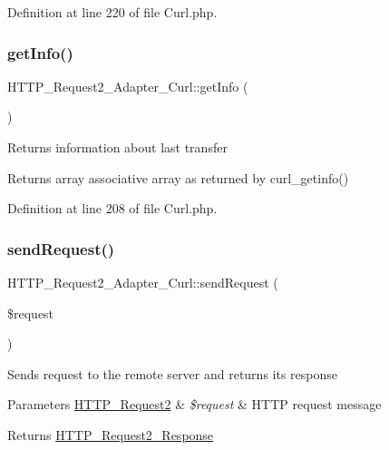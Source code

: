 Definition at line 220 of file Curl.\+php.

\hypertarget{classHTTP__Request2__Adapter__Curl_a9c8c318ec7a6314f235ef4dfea89e6b2}{}\label{classHTTP__Request2__Adapter__Curl_a9c8c318ec7a6314f235ef4dfea89e6b2} 
\subsubsection{\texorpdfstring{get\+Info()}{getInfo()}}
{\footnotesize\ttfamily H\+T\+T\+P\+\_\+\+Request2\+\_\+\+Adapter\+\_\+\+Curl\+::get\+Info (\begin{DoxyParamCaption}{ }\end{DoxyParamCaption})}

Returns information about last transfer

\begin{DoxyReturn}{Returns}
array associative array as returned by curl\+\_\+getinfo() 
\end{DoxyReturn}


Definition at line 208 of file Curl.\+php.

\hypertarget{classHTTP__Request2__Adapter__Curl_a9da450eb1bb1492d1b39c22c2f29bb2b}{}\label{classHTTP__Request2__Adapter__Curl_a9da450eb1bb1492d1b39c22c2f29bb2b} 
\subsubsection{\texorpdfstring{send\+Request()}{sendRequest()}}
{\footnotesize\ttfamily H\+T\+T\+P\+\_\+\+Request2\+\_\+\+Adapter\+\_\+\+Curl\+::send\+Request (\begin{DoxyParamCaption}\item[{\hyperlink{classHTTP__Request2}{H\+T\+T\+P\+\_\+\+Request2}}]{\$request }\end{DoxyParamCaption})}

Sends request to the remote server and returns its response


\begin{DoxyParams}[1]{Parameters}
\hyperlink{classHTTP__Request2}{H\+T\+T\+P\+\_\+\+Request2} & {\em \$request} & H\+T\+TP request message\\
\hline
\end{DoxyParams}
\begin{DoxyReturn}{Returns}
\hyperlink{classHTTP__Request2__Response}{H\+T\+T\+P\+\_\+\+Request2\+\_\+\+Response} 
\end{DoxyReturn}

